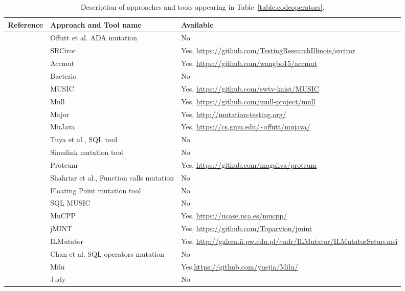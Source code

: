 
\begin{table}[ht]
\tiny
\caption{Description of approaches and tools appearing in Table~\ref{table:codeoperators}.}
\begin{center}
\begin{tabular}{|p{1cm}|p{4cm}|p{8cm}|}
\hline
\textbf{Reference} & \textbf{Approach and Tool name} & \textbf{Available} \\
\hline
\cite{rothermel1996experimental} & Offutt et al. ADA mutation & No\\
\cite{hariri2018srciror} & SRCiror & Yes, \url{https://github.com/TestingResearchIllinois/srciror} \\
\cite{wang2017faster} & Accmut & Yes, \url{https://github.com/wangbo15/accmut}\\
\cite{mateo2012validating} & Bacterio & No \\

\cite{phan2018music} & MUSIC & Yes, \url{https://github.com/swtv-kaist/MUSIC} \\


\cite{denisov2018mull}	&  Mull & Yes, \url{https://github.com/mull-project/mull} \\

\cite{just2014major}	& Major & Yes, \url{http://mutation-testing.org/} \\
\cite{ma2006mujava} & MuJava & Yes, \url{https://cs.gmu.edu/~offutt/mujava/}\\
\cite{tuya2007mutating} & Tuya et al., SQL tool & No\\
\cite{binh2012mutation}	& Simulink mutation tool & No\\
\cite{delamaro2001interface} &	Proteum & Yes, \url{https://github.com/magsilva/proteum} \\
\cite{shahriar2008mutation} & Shahriar et al., Function calls mutation & No \\
\cite{dan2012semantic}	& Floating Point mutation tool & No \\
\cite{shahriar2008music} & SQL MUSIC & No \\
\cite{delgado2017assessment}	& MuCPP & Yes, \url{https://ucase.uca.es/mucpp/} \\
\cite{grechanik2016mutation}	& jMINT & Yes, \url{https://github.com/Toparvion/jmint} \\
\cite{derezinska2011object} & ILMutator & Yes, \url{http://galera.ii.pw.edu.pl/~adr/ILMutator/ILMutatorSetup.msi} \\
\cite{chan2005fault} & Chan et al. SQL operators mutation & No \\

\cite{jia2008milu} & Milu & Yes,\url{https://github.com/yuejia/Milu/} \\
\cite{madeyski2010judy} & Judy & No \\
\hline
\end{tabular}
\end{center}
\label{table:codeMutation:references}
\end{table}%